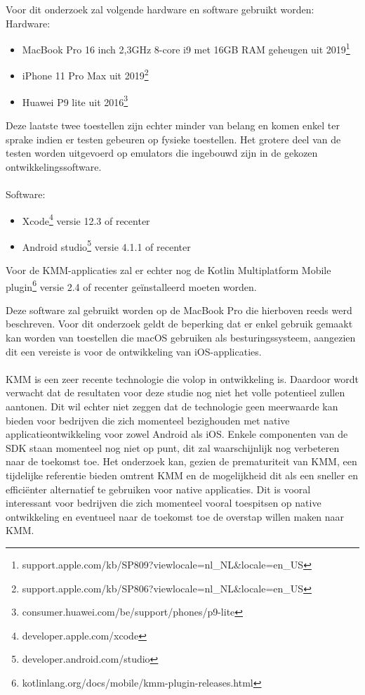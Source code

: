 Voor dit onderzoek zal volgende hardware en software gebruikt worden:\\
Hardware:
\begin{itemize}
    \item MacBook Pro 16 inch 2,3GHz 8-core i9 met 16GB RAM geheugen uit 2019\footnote{support.apple.com/kb/SP809?viewlocale=nl\_NL\&locale=en\_US}
    \item iPhone 11 Pro Max uit 2019\footnote{support.apple.com/kb/SP806?viewlocale=nl\_NL\&locale=en\_US}
    \item Huawei P9 lite uit 2016\footnote{consumer.huawei.com/be/support/phones/p9-lite}
\end{itemize}
Deze laatste twee toestellen zijn echter minder van belang en komen enkel ter sprake indien er testen gebeuren op fysieke toestellen. Het grotere deel van de testen worden uitgevoerd op emulators die ingebouwd zijn in de gekozen ontwikkelingssoftware.\\
\\
Software:
\begin{itemize}
    \item Xcode\footnote{developer.apple.com/xcode} versie 12.3 of recenter
    \item Android studio\footnote{developer.android.com/studio} versie 4.1.1 of recenter
\end{itemize}
Voor de KMM-applicaties zal er echter nog de Kotlin Multiplatform Mobile plugin\footnote{kotlinlang.org/docs/mobile/kmm-plugin-releases.html} versie 2.4 of recenter geïnstalleerd moeten worden.

Deze software zal gebruikt worden op de MacBook Pro die hierboven reeds werd beschreven. Voor dit onderzoek geldt de beperking dat er enkel gebruik gemaakt kan worden van toestellen die macOS gebruiken als besturingssysteem, aangezien dit een vereiste is voor de ontwikkeling van iOS-applicaties.
\\ \\ 
KMM is een zeer recente technologie die volop in ontwikkeling is. Daardoor wordt verwacht dat de resultaten voor deze studie nog niet het volle potentieel zullen aantonen. Dit wil echter niet zeggen dat de technologie geen meerwaarde kan bieden voor bedrijven die zich momenteel bezighouden met native applicatieontwikkeling voor zowel Android als iOS. Enkele componenten van de SDK staan momenteel nog niet op punt, dit zal waarschijnlijk nog verbeteren naar de toekomst toe. Het onderzoek kan, gezien de prematuriteit van KMM, een tijdelijke referentie bieden omtrent KMM en de mogelijkheid dit als een sneller en efficiënter alternatief te gebruiken voor native applicaties. Dit is vooral interessant voor bedrijven die zich momenteel vooral toespitsen op native ontwikkeling en eventueel naar de toekomst toe de overstap willen maken naar KMM. 


